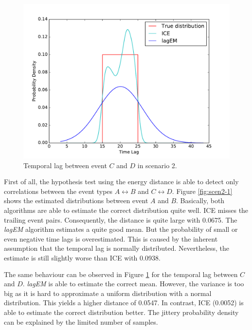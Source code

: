 \documentclass[conference]{IEEEtran}
\theoremstyle{examplestyle}
\begin{document}
\begin{figure}[!htb]
	\centering
	\includegraphics[scale=0.4]{images/scenarios/2-CD.pdf}
	\caption{Temporal lag between event \(C\) and \(D\) in scenario 2.}
	\label{fig:scen2-2}	
\end{figure}

First of all, the hypothesis test using the energy distance is able to detect only correlations between the event types \(A \leftrightarrow B\) and \(C \leftrightarrow D\). Figure \ref{fig:scen2-1} shows the estimated distributions between event \(A\) and \(B\). Basically, both algorithms are able to estimate the correct distribution quite well. \ac{ICE} misses the trailing event pairs. Consequently, the distance is quite large with 0.0675. The \textit{lagEM} algorithm estimates a quite good mean. But the probability of small or even negative time lags is overestimated. This is caused by the inherent assumption that the temporal lag is normally distributed. Nevertheless, the estimate is still slightly worse than \ac{ICE} with 0.0938.

The same behaviour can be observed in Figure \ref{fig:scen2-2} for the temporal lag between \(C\) and \(D\). \textit{lagEM} is able to estimate the correct mean. However, the variance is too big as it is hard to approximate a uniform distribution with a normal distribution. This yields a higher distance of 0.0547. In contrast, \ac{ICE} (0.0052) is able to estimate the correct distribution better. The jittery probability density can be explained by the limited number of samples.
\end{document}
